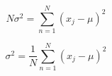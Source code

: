 \documentclass[a4paper,10pt]{article}
\begin{document}
\begin{equation*}
N\sigma^2 = \sum_{n = 1}^{N} (x_j - \mu)^2
\end{equation*}

\begin{equation*}
\sigma^2 = \frac{1}{N}\sum_{n = 1}^{N} (x_j - \mu)^2
\end{equation*}

%
%
%

%
%
%


\end{document}
